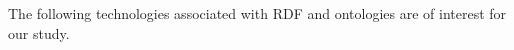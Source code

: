 The following technologies associated with \gls{RDF} and ontologies
are of interest for our study.
%    
%    
%    

